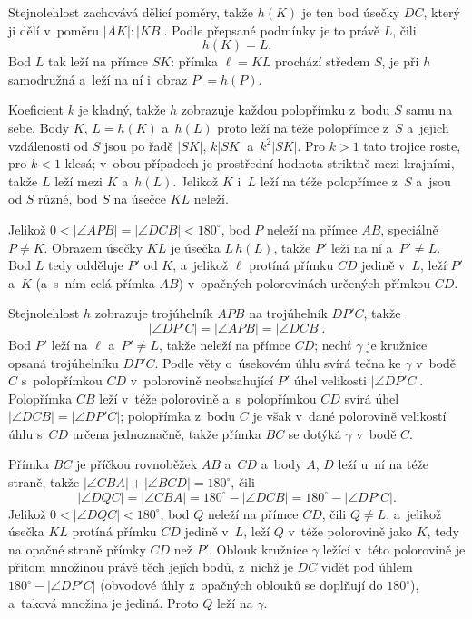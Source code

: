 {    Stejnolehlost zachovává dělicí poměry, takže $h(K)$ je ten bod úsečky $DC$, který ji dělí v~poměru $|AK| : |KB|$. Podle přepsané podmínky je to právě $L$, čili
    $$
    h(K) = L.
    $$
    Bod $L$ tak leží na přímce $SK$: přímka $\ell = KL$ prochází středem $S$, je při $h$ samodružná a~leží na ní i~obraz $P' = h(P)$.

    Koeficient $k$ je kladný, takže $h$ zobrazuje každou polopřímku z~bodu $S$ samu na sebe. Body $K$, $L = h(K)$ a~$h(L)$ proto leží na téže polopřímce z~$S$ a~jejich vzdálenosti od $S$ jsou po řadě $|SK|$, $k|SK|$ a~$k^2|SK|$. Pro $k > 1$ tato trojice roste, pro $k < 1$ klesá; v~obou případech je prostřední hodnota striktně mezi krajními, takže $L$ leží mezi $K$ a~$h(L)$. Jelikož $K$ i~$L$ leží na téže polopřímce z~$S$ a~jsou od $S$ různé, bod $S$ na úsečce $KL$ neleží.

    Jelikož $0 < |\angle APB| = |\angle DCB| < 180^\circ$, bod $P$ neleží na přímce $AB$, speciálně $P \neq K$. Obrazem úsečky $KL$ je úsečka $L\,h(L)$, takže $P'$ leží na ní a~$P' \neq L$. Bod $L$ tedy odděluje $P'$ od $K$, a~jelikož $\ell$ protíná přímku $CD$ jedině v~$L$, leží $P'$ a~$K$ (a~s~ním celá přímka $AB$) v~opačných polorovinách určených přímkou $CD$.

    Stejnolehlost $h$ zobrazuje trojúhelník $APB$ na trojúhelník $DP'C$, takže
    $$
    |\angle DP'C| = |\angle APB| = |\angle DCB|.
    $$
    Bod $P'$ leží na $\ell$ a~$P' \neq L$, takže neleží na přímce $CD$; nechť $\gamma$ je kružnice opsaná trojúhelníku $DP'C$. Podle věty o~úsekovém úhlu svírá tečna ke $\gamma$ v~bodě $C$ s~polopřímkou $CD$ v~polorovině neobsahující $P'$ úhel velikosti $|\angle DP'C|$. Polopřímka $CB$ leží v~téže polorovině a~s~polopřímkou $CD$ svírá úhel $|\angle DCB| = |\angle DP'C|$; polopřímka z~bodu $C$ je však v~dané polorovině velikostí úhlu s~$CD$ určena jednoznačně, takže přímka $BC$ se dotýká $\gamma$ v~bodě $C$.

    Přímka $BC$ je příčkou rovnoběžek $AB$ a~$CD$ a~body $A$, $D$ leží u~ní na téže straně, takže $|\angle CBA| + |\angle BCD| = 180^\circ$, čili
    $$
    |\angle DQC| = |\angle CBA| = 180^\circ - |\angle DCB| = 180^\circ - |\angle DP'C|.
    $$
    Jelikož $0 < |\angle DQC| < 180^\circ$, bod $Q$ neleží na přímce $CD$, čili $Q \neq L$, a~jelikož úsečka $KL$ protíná přímku $CD$ jedině v~$L$, leží $Q$ v~téže polorovině jako $K$, tedy na opačné straně přímky $CD$ než $P'$. Oblouk kružnice $\gamma$ ležící v~této polorovině je přitom množinou právě těch jejích bodů, z~nichž je $DC$ vidět pod úhlem $180^\circ - |\angle DP'C|$ (obvodové úhly z~opačných oblouků se doplňují do $180^\circ$), a~taková množina je jediná. Proto $Q$ leží na $\gamma$.

}
